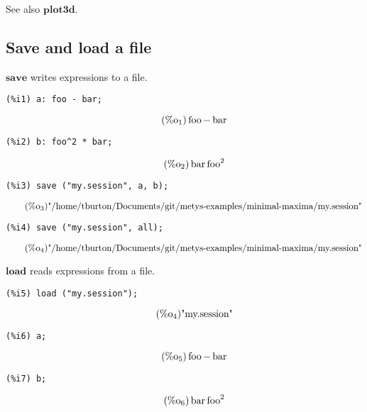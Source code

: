 \documentclass[12pt,leqno]{article}
\begin{document}
See also $\mathbf{plot3d}$.

\subsection{Save and load a file}

$\mathbf{save}$ writes expressions to a file.
\begin{verbatim}
(%i1) a: foo - bar;
\end{verbatim}
\begin{equation}
\tag{$\mathop{\mathrm{\%o}_{1}}$}\mathop{\mathrm{foo}}-\mathop{\mathrm{bar}}
\label{eq:doc-group1-code32-1-1}
\end{equation}
\begin{verbatim}
(%i2) b: foo^2 * bar;
\end{verbatim}
\begin{equation}
\tag{$\mathop{\mathrm{\%o}_{2}}$}\mathop{\mathrm{bar}} {\mathop{\mathrm{foo}}}^{2}
\label{eq:doc-group1-code32-2-1}
\end{equation}
\begin{verbatim}
(%i3) save ("my.session", a, b);
\end{verbatim}
\begin{equation}
\tag{$\mathop{\mathrm{\%o}_{3}}$}\mbox{"/home/tburton/Documents/git/metys-examples/minimal-maxima/my.session"}
\label{eq:doc-group1-code32-3-1}
\end{equation}
\begin{verbatim}
(%i4) save ("my.session", all);
\end{verbatim}
\begin{equation}
\tag{$\mathop{\mathrm{\%o}_{4}}$}\mbox{"/home/tburton/Documents/git/metys-examples/minimal-maxima/my.session"}
\label{eq:doc-group1-code32-4-1}
\end{equation}


$\mathbf{load}$ reads expressions from a file.
\begin{verbatim}
(%i5) load ("my.session");
\end{verbatim}
\begin{equation}
\tag{$\mathop{\mathrm{\%o}_{4}}$}\mbox{"my.session"}
\label{eq:doc-group1-code33-1-1}
\end{equation}
\begin{verbatim}
(%i6) a;
\end{verbatim}
\begin{equation}
\tag{$\mathop{\mathrm{\%o}_{5}}$}\mathop{\mathrm{foo}}-\mathop{\mathrm{bar}}
\label{eq:doc-group1-code33-2-1}
\end{equation}
\begin{verbatim}
(%i7) b;
\end{verbatim}
\begin{equation}
\tag{$\mathop{\mathrm{\%o}_{6}}$}\mathop{\mathrm{bar}} {\mathop{\mathrm{foo}}}^{2}
\label{eq:doc-group1-code33-3-1}
\end{equation}
\end{document}
